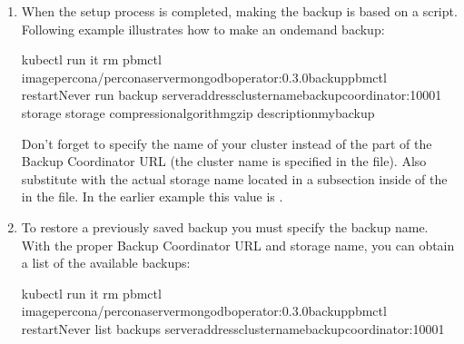 \documentclass[letterpaper,10pt,english]{sphinxmanual}
\begin{document}
\begin{enumerate}
\begin{sphinxVerbatim}[commandchars=\\\{\}]
\PYGZdl{} kubectl apply \PYGZhy{}f deploy/backup\PYGZhy{}s3.yaml
\end{sphinxVerbatim}

\item {} 
When the setup process is completed, making the backup is based on a script.
Following example illustrates how to make an on\sphinxhyphen{}demand backup:

\begin{sphinxVerbatim}[commandchars=\\\{\}]
kubectl run \PYGZhy{}it \PYGZhy{}\PYGZhy{}rm pbmctl \PYGZhy{}\PYGZhy{}imagepercona/percona\PYGZhy{}server\PYGZhy{}mongodb\PYGZhy{}operator:0.3.0\PYGZhy{}backup\PYGZhy{}pbmctl \PYGZhy{}\PYGZhy{}restartNever \PYGZhy{}\PYGZhy{} 
  run backup 
  \PYGZhy{}\PYGZhy{}server\PYGZhy{}address\PYGZlt{}cluster\PYGZhy{}name\PYGZgt{}\PYGZhy{}backup\PYGZhy{}coordinator:10001 
  \PYGZhy{}\PYGZhy{}storage \PYGZlt{}storage\PYGZgt{} 
  \PYGZhy{}\PYGZhy{}compression\PYGZhy{}algorithmgzip 
  \PYGZhy{}\PYGZhy{}descriptionmy\PYGZhy{}backup
\end{sphinxVerbatim}

Don’t forget to specify the name of your cluster instead of the
 part of the Backup Coordinator URL (the
cluster name is specified in the
file). Also substitute  with the actual
storage name located in a subsection inside of the
 in the
file. In the earlier example this value is .

\item {} 
To restore a previously saved backup you must specify the
backup name. With the proper Backup Coordinator URL and storage name, you can obtain a list of the available backups:

\begin{sphinxVerbatim}[commandchars=\\\{\}]
kubectl run \PYGZhy{}it \PYGZhy{}\PYGZhy{}rm pbmctl \PYGZhy{}\PYGZhy{}imagepercona/percona\PYGZhy{}server\PYGZhy{}mongodb\PYGZhy{}operator:0.3.0\PYGZhy{}backup\PYGZhy{}pbmctl \PYGZhy{}\PYGZhy{}restartNever \PYGZhy{}\PYGZhy{} list backups \PYGZhy{}\PYGZhy{}server\PYGZhy{}address\PYGZlt{}cluster\PYGZhy{}name\PYGZgt{}\PYGZhy{}backup\PYGZhy{}coordinator:10001
\end{sphinxVerbatim}


\end{enumerate}
\end{document}
